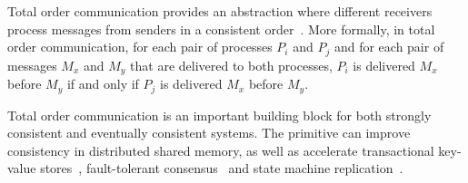 Total order communication provides an abstraction where different receivers process messages from senders in a consistent order~\cite{kshemkalyani2011distributed}.
More formally, in total order communication, for each pair of processes $P_i$ and $P_j$ and for each pair of messages $M_x$ and $M_y$ that are delivered to both processes, $P_i$ is delivered $M_x$ before $M_y$ if and only if $P_j$ is delivered $M_x$ before $M_y$.

Total order communication is an important building block for both strongly consistent and eventually consistent systems.
The primitive can improve consistency in distributed shared memory, as well as accelerate transactional key-value stores~\cite{ports2015designing, eris}, fault-tolerant consensus~\cite{li2016just} and state machine replication~\cite{state-machine-replication}.




